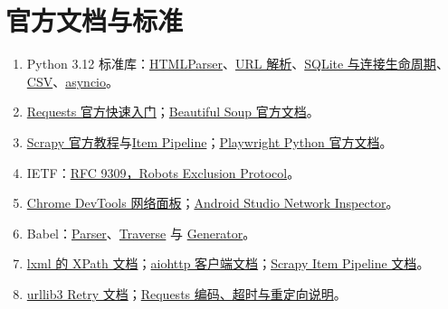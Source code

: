 \section*{官方文档与标准}
\begin{enumerate}
\item Python 3.12 标准库：\href{https://docs.python.org/3.12/library/html.parser.html}{HTMLParser}、\href{https://docs.python.org/3.12/library/urllib.parse.html}{URL 解析}、\href{https://docs.python.org/3.12/library/sqlite3.html}{SQLite 与连接生命周期}、\href{https://docs.python.org/3.12/library/csv.html}{CSV}、\href{https://docs.python.org/3.12/library/asyncio.html}{asyncio}。
\item \href{https://requests.readthedocs.io/en/stable/user/quickstart/}{Requests 官方快速入门}；\href{https://www.crummy.com/software/BeautifulSoup/bs4/doc/}{Beautiful Soup 官方文档}。
\item \href{https://docs.scrapy.org/en/latest/intro/tutorial.html}{Scrapy 官方教程}与\href{https://docs.scrapy.org/en/latest/topics/item-pipeline.html}{Item Pipeline}；\href{https://playwright.dev/python/docs/intro}{Playwright Python 官方文档}。
\item IETF：\href{https://www.rfc-editor.org/rfc/rfc9309.html}{RFC 9309，Robots Exclusion Protocol}。
\item \href{https://developer.chrome.com/docs/devtools/network}{Chrome DevTools 网络面板}；\href{https://developer.android.com/studio/debug/network-profiler}{Android Studio Network Inspector}。
\item Babel：\href{https://babeljs.io/docs/babel-parser}{Parser}、\href{https://babeljs.io/docs/babel-traverse}{Traverse} 与 \href{https://babeljs.io/docs/babel-generator}{Generator}。
\item \href{https://lxml.de/xpathxslt.html}{lxml 的 XPath 文档}；\href{https://docs.aiohttp.org/en/stable/client_quickstart.html}{aiohttp 客户端文档}；\href{https://docs.scrapy.org/en/latest/topics/item-pipeline.html}{Scrapy Item Pipeline 文档}。
\item \href{https://urllib3.readthedocs.io/en/stable/reference/urllib3.util.html}{urllib3 Retry 文档}；\href{https://requests.readthedocs.io/en/latest/user/quickstart/}{Requests 编码、超时与重定向说明}。
\end{enumerate}
